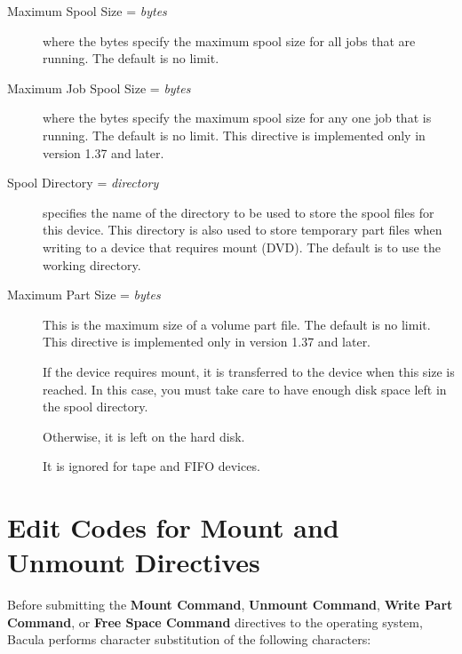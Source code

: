 \begin{description}
\item [Maximum Spool Size = {\it bytes}]
   where the bytes specify the maximum spool size for all jobs that are
   running.  The default is no limit.

\item [Maximum Job Spool Size = {\it bytes}]
   where the bytes specify the maximum spool size for any one job  that is
   running. The default is no limit. 
   This directive is implemented only in version 1.37 and later.

\item [Spool Directory = {\it directory}]
   specifies the name of the directory to be used to store  the spool files for
   this device. This directory is also used to store  temporary part files when
   writing to a device that requires mount (DVD).  The default is to use the
   working directory. 

\item [Maximum Part Size = {\it bytes}]
   This is the maximum size of a volume part file. The default is no limit.
   This directive is implemented only in version 1.37 and later.

   If the device requires  mount, it is transferred to the device when this size
   is reached.  In this case, you must take care to have enough disk space left
   in  the spool directory.  

   Otherwise, it is left on the hard disk.  

   It is ignored for tape and FIFO devices.  


\end{description}

\label{mountcodes}
\section{Edit Codes for Mount and Unmount Directives} 

Before submitting the {\bf Mount Command}, {\bf Unmount Command}, 
{\bf Write Part Command}, or {\bf Free Space Command} directives 
to the operating system, Bacula performs character substitution of the
following characters:

